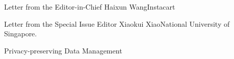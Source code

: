 \documentclass[11pt]{article}
\begin{document}


\begin{bulletin}


%
%

\begin{lettersection}


\begin{letter}{Letter from the Editor-in-Chief}
{Haixun Wang}{Instacart}

\end{letter}
%
\newpage


\newpage

%
%
\begin{letter}{Letter from the Special Issue Editor}
 {Xiaokui Xiao}{National University of Singapore.}
 
\end{letter}

\newpage

\end{lettersection}

\begin{articlesection}{Privacy-preserving Data Management}
%
%


\end{articlesection}
\end{bulletin}
\end{document}
